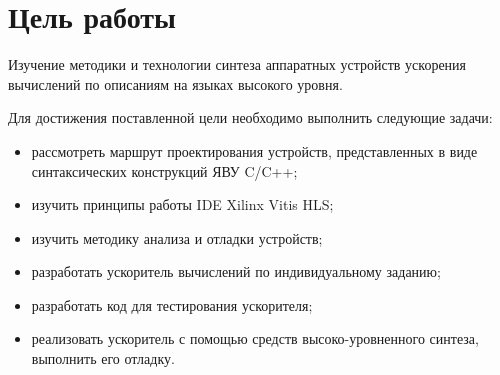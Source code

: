 \setcounter{page}{2}
\chapter*{Цель работы}
Изучение методики и технологии синтеза аппаратных устройств ускорения вычислений по описаниям на языках высокого уровня. 

Для достижения поставленной цели необходимо выполнить следующие задачи:
\begin{itemize}
	\item рассмотреть маршрут проектирования устройств, представленных в виде синтаксических конструкций ЯВУ C/C++;
	\item изучить принципы работы IDE Xilinx Vitis HLS;
	\item изучить методику анализа и отладки устройств;
	\item разработать ускоритель вычислений по индивидуальному заданию;
	\item разработать код для тестирования ускорителя;
	\item реализовать ускоритель с помощью средств высоко-уровненного синтеза, выполнить его отладку.
\end{itemize}